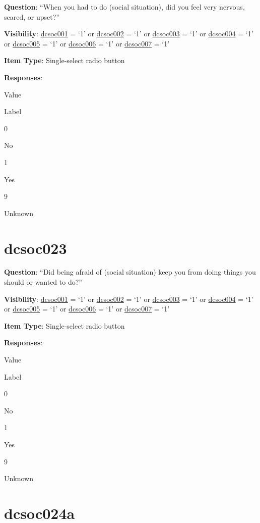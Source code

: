 \documentclass[]{book}
\begin{document}
\textbf{Question}: ``When you had to do (social situation), did you feel very nervous, scared, or upset?''

\textbf{Visibility}: \protect\hyperlink{dcsoc001}{dcsoc001} = `1' or \protect\hyperlink{dcsoc002}{dcsoc002} = `1' or \protect\hyperlink{dcsoc003}{dcsoc003} = `1' or \protect\hyperlink{dcsoc004}{dcsoc004} = `1' or \protect\hyperlink{dcsoc005}{dcsoc005} = `1' or \protect\hyperlink{dcsoc006}{dcsoc006} = `1' or \protect\hyperlink{dcsoc007}{dcsoc007} = `1'

\textbf{Item Type}: Single-select radio button

\textbf{Responses}:

Value

Label

0

No

1

Yes

9

Unknown

\hypertarget{dcsoc023}{%
\section{dcsoc023}\label{dcsoc023}}

\textbf{Question}: ``Did being afraid of (social situation) keep you from doing things you should or wanted to do?''

\textbf{Visibility}: \protect\hyperlink{dcsoc001}{dcsoc001} = `1' or \protect\hyperlink{dcsoc002}{dcsoc002} = `1' or \protect\hyperlink{dcsoc003}{dcsoc003} = `1' or \protect\hyperlink{dcsoc004}{dcsoc004} = `1' or \protect\hyperlink{dcsoc005}{dcsoc005} = `1' or \protect\hyperlink{dcsoc006}{dcsoc006} = `1' or \protect\hyperlink{dcsoc007}{dcsoc007} = `1'

\textbf{Item Type}: Single-select radio button

\textbf{Responses}:

Value

Label

0

No

1

Yes

9

Unknown

\hypertarget{dcsoc024a}{%
\section{dcsoc024a}\label{dcsoc024a}}
\end{document}
